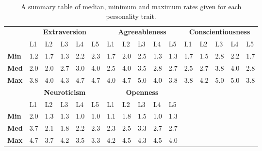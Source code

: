 \begin{table}[H]
    \renewcommand{\arraystretch}{1}
    \begin{center}
        \begin{tabular}{p{}|
        p{}|p{}|p{}|p{}|p{}||
        p{}|p{}|p{}|p{}|p{}||
        p{}|p{}|p{}|p{}|p{}|}
            \cline{2-16}
            & \multicolumn{5}{c||}{\textbf{Extraversion}} & \multicolumn{5}{c||}{\textbf{Agreeableness}}
            & \multicolumn{5}{c|}{\textbf{Conscientiousness}} \\
            \cline{2-16}
            & L1 & L2 & L3 & L4 & L5 & L1 & L2 & L3 & L4 & L5 & L1 & L2 & L3 & L4 & L5      \\
            \cline{2-16}
            \textbf{Min}    & 1.2 & 1.7 & 1.3 & 2.2 & 2.3 & 1.7 & 2.0 & 2.5 & 1.3 & 1.3 & 1.7 & 1.5 & 2.8 & 2.2 & 1.7  \\
            \textbf{Med}    & 2.0 & 2.0 & 2.7 & 3.0 & 4.0 & 2.5 & 4.0 & 3.5 & 2.8 & 2.7 & 2.5 & 2.7 & 3.8 & 4.0 & 2.8  \\
            \textbf{Max}    & 3.8 & 4.0 & 4.3 & 4.7 & 4.7 & 4.0 & 4.7 & 5.0 & 4.0 & 3.8 & 3.8 & 4.2 & 5.0 & 5.0 & 3.8 \\
            \cline{2-16}
            \cline{2-11}
            &  \multicolumn{5}{|c||}{\textbf{Neuroticism}} & \multicolumn{5}{|c||}{\textbf{Openness}} \\
            \cline{2-11}
            & L1 & L2 & L3 & L4 & L5 & L1 & L2 & L3 & L4 & L5            \\
            \cline{2-11}
            \textbf{Min}    & 2.0 & 1.3 & 1.3 & 1.0 & 1.0 & 1.1 & 1.8 & 1.5 & 1.0 & 1.3    \\
            \textbf{Med}    & 3.7 & 2.1 & 1.8 & 2.2 & 2.3 & 2.3 & 2.5 & 3.3 & 2.7 & 2.7    \\
            \textbf{Max}    & 4.7 & 3.7 & 4.2 & 3.5 & 3.3 & 4.2 & 4.5 & 4.3 & 4.5 & 4.0    \\
            \cline{2-11}
        \end{tabular}
        \caption[]{A summary table of median, minimum and maximum rates given for each personality trait.\footnotemark}
        \label{table:medianMM1}
    \end{center}
\end{table}

